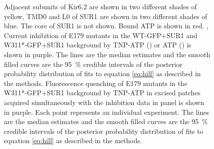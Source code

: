 \begin{figure}[hbtp]
{	Adjacent subunits of Kir6.2 are shown in two different shades of yellow, TMD0 and L0 of SUR1 are shown in two different shades of blue.
	The core of SUR1 is not shown.
	Bound ATP is shown in red.
	,  Current inhibition of E179 mutants in the WT-GFP+SUR1 and W311*-GFP+SUR1 background by TNP-ATP () or ATP () is shown in purple.
	The lines are the median estimates and the smooth filled curves are the \SI{95}{\percent} credible intervals of the posterior probability distribution of fits to equation \ref{eq:hill} as described in the methods.
	 Fluorescence quenching of E179 mutants in the W311*-GFP+SUR1 background by TNP-ATP in excised patches acquired simultaneously with the inhibition data in panel  is shown in purple.
	Each point represents an individual experiment.
	The lines are the median estimates and the smooth filled curves are the \SI{95}{\percent} credible intervals of the posterior probability distribution of fits to equation \ref{eq:hill} as described in the methods.
	}\label{ch5fig:e179_1}
\end{figure}

